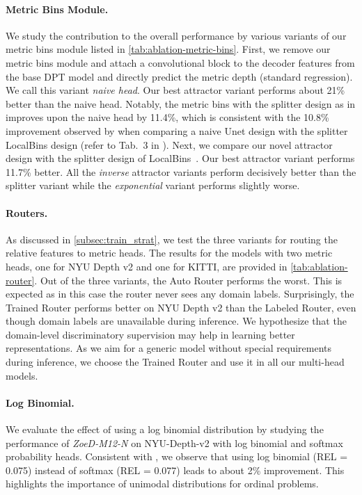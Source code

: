 \documentclass[10pt,twocolumn,letterpaper]{article}
\begin{document}
\paragraph{Metric Bins Module.}
We study the contribution to the overall performance by various variants of our metric bins module listed in \cref{tab:ablation-metric-bins}.
First, we remove our metric bins module and attach a convolutional block to the decoder features from the base DPT model and directly predict the metric depth (standard regression). We call this variant \textit{naive head}. Our best attractor variant performs about 21\% better than the naive head. Notably, the metric bins with the splitter design as in \cite{bhat2022localbins} improves upon the naive head by 11.4\%, which is consistent with the 10.8\% improvement observed by \cite{bhat2022localbins} when comparing a naive Unet design with the splitter LocalBins design (refer to Tab.~3 in \cite{bhat2022localbins}). 
Next, we compare our novel attractor design with the splitter design of LocalBins~\cite{bhat2022localbins}. Our best attractor variant performs 11.7\% better. All the \textit{inverse} attractor variants perform decisively better than the splitter variant while the \textit{exponential} variant performs slightly worse. 

\paragraph{Routers.}
As discussed in \cref{subsec:train_strat}, we test the three variants for routing the relative features to metric heads. The results for the models with two metric heads, one for NYU Depth v2 and one for KITTI, are provided in \cref{tab:ablation-router}. Out of the three variants, the Auto Router performs the worst. This is expected as in this case the router never sees any domain labels. Surprisingly, the Trained Router performs
better on NYU Depth v2 than the Labeled Router, even though domain labels are unavailable during inference. We hypothesize that the domain-level discriminatory supervision may help in learning better representations. As we aim for a generic model without special requirements during inference, we choose the Trained Router and use it in all our multi-head models.

\paragraph{Log Binomial.}
We evaluate the effect of using a log binomial distribution by studying the performance of \textit{ZoeD-M12-N} on NYU-Depth-v2 with log binomial and softmax probability heads. Consistent with \cite{unimodal-pmlr-v70-beckham17a}, we observe that using log binomial (REL = 0.075) instead of softmax (REL = 0.077) leads to about 2\% improvement. This highlights the importance of unimodal distributions for ordinal problems.
\end{document}

